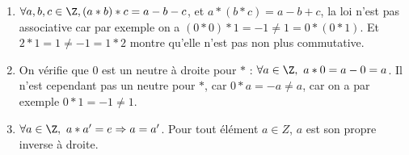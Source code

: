 \begin{enumerate}[label=\alph*)]
    \item $\forall a,b,c \in \Z, (a \ast b) \ast c = a - b - c $, et  $ a \ast (b \ast c) = a - b + c $, la loi n'est pas associative car par exemple on a $(0\ast 0) \ast 1 = -1 \neq 1 = 0 \ast (0 \ast 1)$. Et $2 \ast 1 = 1 \neq -1 = 1 \ast 2$ montre qu'elle n'est pas non plus commutative.
    \item On vérifie que $0$ est un neutre à droite pour $\ast$ : $\forall a \in \Z,\ a \ast 0 = a - 0 = a$. Il n'est cependant pas un neutre pour $\ast$, car $0 \ast a = -a \neq a$, car on a par exemple $0 \ast 1 = -1 \neq 1$.
    \item $\forall a \in \Z,\ a \ast a' = e \Rightarrow a = a'$. Pour tout élément $a \in Z$, $a$ est son propre inverse à droite.
\end{enumerate}